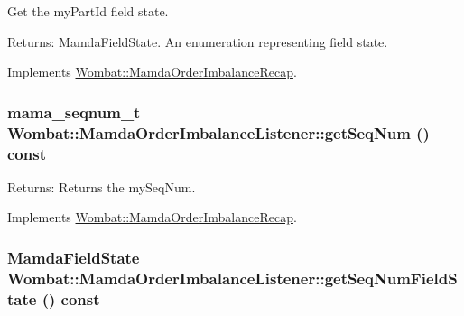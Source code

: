Get the my\-Part\-Id field state. 

\begin{Desc}
\item[Returns:]Mamda\-Field\-State. An enumeration representing field state. \end{Desc}


Implements \hyperlink{classWombat_1_1MamdaOrderImbalanceRecap_841fcf0b983e68acb4da8b3aad428d47}{Wombat::Mamda\-Order\-Imbalance\-Recap}.\hypertarget{classWombat_1_1MamdaOrderImbalanceListener_dc73bf6c66194774ffd211ab9fb44b6c}{
\subsubsection[getSeqNum]{\setlength{\rightskip}{0pt plus 5cm}mama\_\-seqnum\_\-t Wombat::Mamda\-Order\-Imbalance\-Listener::get\-Seq\-Num () const}}
\label{classWombat_1_1MamdaOrderImbalanceListener_dc73bf6c66194774ffd211ab9fb44b6c}


\begin{Desc}
\item[Returns:]Returns the my\-Seq\-Num. \end{Desc}


Implements \hyperlink{classWombat_1_1MamdaOrderImbalanceRecap_2602c30d3dfd6dc8dd9aceaa33c4de24}{Wombat::Mamda\-Order\-Imbalance\-Recap}.\hypertarget{classWombat_1_1MamdaOrderImbalanceListener_59ef970a6b416d746105d9e766c1d1a8}{
\subsubsection[getSeqNumFieldState]{\setlength{\rightskip}{0pt plus 5cm}\hyperlink{namespaceWombat_93aac974f2ab713554fd12a1fa3b7d2a}{Mamda\-Field\-State} Wombat::Mamda\-Order\-Imbalance\-Listener::get\-Seq\-Num\-Field\-State () const}}
\label{classWombat_1_1MamdaOrderImbalanceListener_59ef970a6b416d746105d9e766c1d1a8}


